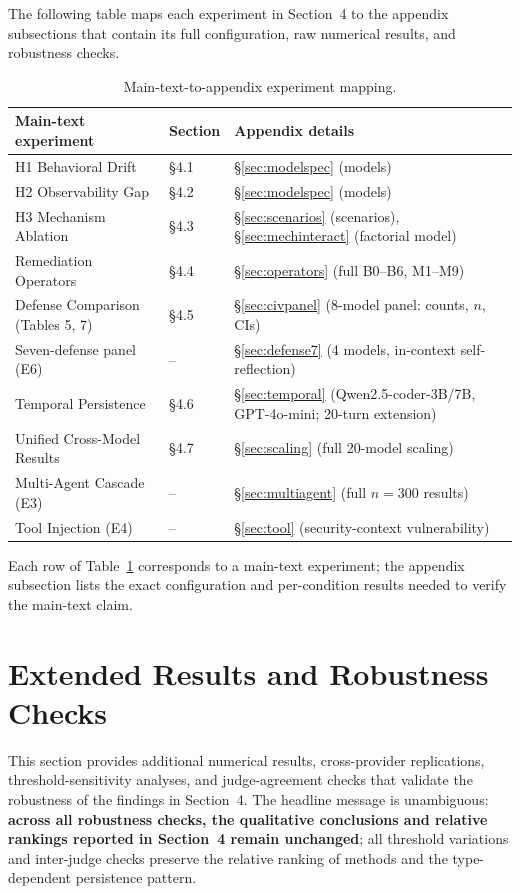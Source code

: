 \documentclass{article}
\theoremstyle{plain}
\theoremstyle{definition}
\begin{document}
The following table maps each experiment in Section~4 to the appendix subsections that contain its full configuration, raw numerical results, and robustness checks.

\begin{table}[!htbp]
\centering
\caption{Main-text-to-appendix experiment mapping.}
\label{tab:mainmap}
\small
\begin{tabular}{@{}lll@{}}
\toprule
\textbf{Main-text experiment} & \textbf{Section} & \textbf{Appendix details} \\
\midrule
H1 Behavioral Drift          & \S4.1  & \S\ref{sec:modelspec} (models) \\
H2 Observability Gap         & \S4.2  & \S\ref{sec:modelspec} (models) \\
H3 Mechanism Ablation        & \S4.3  & \S\ref{sec:scenarios} (scenarios), \S\ref{sec:mechinteract} (factorial model) \\
Remediation Operators        & \S4.4  & \S\ref{sec:operators} (full B0--B6, M1--M9) \\
Defense Comparison (Tables 5, 7) & \S4.5  & \S\ref{sec:civpanel} (8-model panel: counts, $n$, CIs) \\
Seven-defense panel (E6)     & --     & \S\ref{sec:defense7} (4 models, in-context self-reflection) \\
Temporal Persistence         & \S4.6  & \S\ref{sec:temporal} (Qwen2.5-coder-3B/7B, GPT-4o-mini; 20-turn extension) \\
Unified Cross-Model Results  & \S4.7  & \S\ref{sec:scaling} (full 20-model scaling) \\
Multi-Agent Cascade (E3)     & --     & \S\ref{sec:multiagent} (full $n=300$ results) \\
Tool Injection (E4)          & --     & \S\ref{sec:tool} (security-context vulnerability) \\
\bottomrule
\end{tabular}
\end{table}

Each row of Table~\ref{tab:mainmap} corresponds to a main-text experiment; the appendix subsection lists the exact configuration and per-condition results needed to verify the main-text claim.

\section{Extended Results and Robustness Checks}
\label{sec:extended}

This section provides additional numerical results, cross-provider replications, threshold-sensitivity analyses, and judge-agreement checks that validate the robustness of the findings in Section~4. The headline message is unambiguous: \textbf{across all robustness checks, the qualitative conclusions and relative rankings reported in Section~4 remain unchanged}; all threshold variations and inter-judge checks preserve the relative ranking of methods and the type-dependent persistence pattern.
\end{document}
